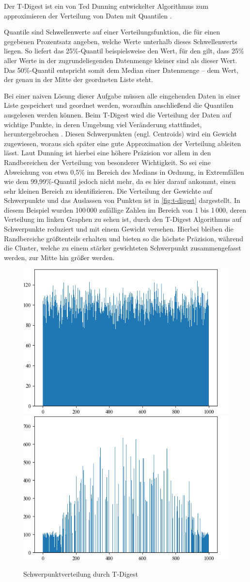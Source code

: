 Der T-Digest ist ein von Ted Dunning entwickelter Algorithmus zum approximieren der Verteilung von Daten mit Quantilen \cite{dunning2019}.

Quantile sind Schwellenwerte auf einer Verteilungsfunktion, die für einen gegebenen Prozentsatz angeben, welche Werte unterhalb dieses Schwellenwerts liegen.
So liefert das 25\%-Quantil beispielsweise den Wert, für den gilt, dass 25\% aller Werte in der zugrundeliegenden Datenmenge kleiner sind als dieser Wert.
Das 50\%-Quantil entspricht somit dem Median einer Datenmenge -- dem Wert, der genau in der Mitte der geordneten Liste steht.

Bei einer naiven Lösung dieser Aufgabe müssen alle eingehenden Daten in einer Liste gespeichert und geordnet werden, woraufhin anschließend die Quantilen ausgelesen werden können.
Beim T-Digest wird die Verteilung der Daten auf wichtige Punkte, in deren Umgebung viel Veränderung stattfindet, heruntergebrochen \cite{davidsonpilon2015}.
Diesen Schwerpunkten (engl. Centroids) wird ein Gewicht zugewiesen, woraus sich später eine gute Approximation der Verteilung ableiten lässt.
Laut Dunning \cite{dunning2015} ist hierbei eine höhere Präzision vor allem in den Randbereichen der Verteilung von besonderer Wichtigkeit.
So sei eine Abweichung von etwa 0,5\% im Bereich des Medians in Ordnung, in Extremfällen wie dem 99,99\%-Quantil jedoch nicht mehr, da es hier darauf ankommt, einen sehr kleinen Bereich zu identifizieren.
Die Verteilung der Gewichte auf Schwerpunkte und das Auslassen von Punkten ist in \autoref{fig:t-digest} dargestellt.
In diesem Beispiel wurden 100\,000 zufällige Zahlen im Bereich von 1 bis 1\,000, deren Verteilung im linken Graphen zu sehen ist, durch den T-Digest Algorithmus auf Schwerpunkte reduziert und mit einem Gewicht versehen.
Hierbei bleiben die Randbereiche größtenteils erhalten und bieten so die höchste Präzision, während die Cluster, welche zu einem stärker gewichteten Schwerpunkt zusammengefasst werden, zur Mitte hin größer werden.

\begin{figure}[b]
	\centering
	\includegraphics[width=.49\linewidth]{images/t_digest_data.png}
	\includegraphics[width=.49\linewidth]{images/t_digest_sorted.png}
	\caption{Schwerpunktverteilung durch T-Digest}
	\label{fig:t-digest}
\end{figure}

